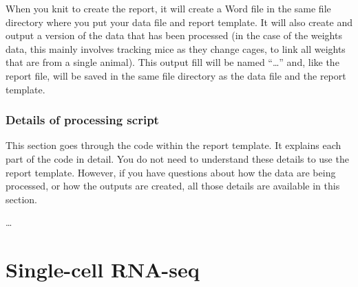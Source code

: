 \documentclass[
]{book}
\begin{document}
When you knit to create the report, it will create a Word file in the
same file directory where you put your data file and report template.
It will also create and output a version of the data that has been
processed (in the case of the weights data, this mainly involves
tracking mice as they change cages, to link all weights that are from
a single animal). This output fill will be named ``\ldots{}'' and, like
the report file, will be saved in the same file directory as the
data file and the report template.

\hypertarget{details-of-processing-script-2}{%
\subsection{Details of processing script}\label{details-of-processing-script-2}}

This section goes through the code within the report template. It
explains each part of the code in detail. You do not need to understand
these details to use the report template. However, if you have questions
about how the data are being processed, or how the outputs are created,
all those details are available in this section.

\ldots{}

\hypertarget{single-cell-rna-seq}{%
\chapter{Single-cell RNA-seq}\label{single-cell-rna-seq}}

  
\end{document}
